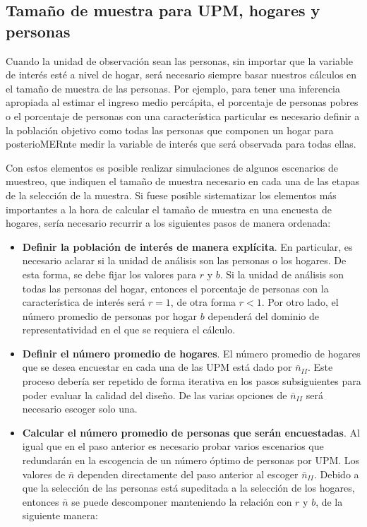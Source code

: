 \documentclass[
  12pt,
  spanish,
]{book}
\begin{document}
\hypertarget{tamauxf1o-de-muestra-para-upm-hogares-y-personas}{%
\subsection{Tamaño de muestra para UPM, hogares y personas}\label{tamauxf1o-de-muestra-para-upm-hogares-y-personas}}

Cuando la unidad de observación sean las personas, sin importar que la variable de interés esté a nivel de hogar, será necesario siempre basar nuestros cálculos en el tamaño de muestra de las personas. Por ejemplo, para tener una inferencia apropiada al estimar el ingreso medio percápita, el porcentaje de personas pobres o el porcentaje de personas con una característica particular es necesario definir a la población objetivo como todas las personas que componen un hogar para posterioMERnte medir la variable de interés que será observada para todas ellas.

Con estos elementos es posible realizar simulaciones de algunos escenarios de muestreo, que indiquen el tamaño de muestra necesario en cada una de las etapas de la selección de la muestra. Si fuese posible sistematizar los elementos más importantes a la hora de calcular el tamaño de muestra en una encuesta de hogares, sería necesario recurrir a los siguientes pasos de manera ordenada:

\begin{itemize}
\item
  \textbf{Definir la población de interés de manera explícita}. En particular, es necesario aclarar si la unidad de análisis son las personas o los hogares. De esta forma, se debe fijar los valores para \(r\) y \(b\). Si la unidad de análisis son todas las personas del hogar, entonces el porcentaje de personas con la característica de interés será \(r = 1\), de otra forma \(r<1\). Por otro lado, el número promedio de personas por hogar \(b\) dependerá del dominio de representatividad en el que se requiera el cálculo.
\item
  \textbf{Definir el número promedio de hogares}. El número promedio de hogares que se desea encuestar en cada una de las UPM está dado por \(\bar{n}_{II}\). Este proceso debería ser repetido de forma iterativa en los pasos subsiguientes para poder evaluar la calidad del diseño. De las varias opciones de \(\bar{n}_{II}\) será necesario escoger solo una.
\item
  \textbf{Calcular el número promedio de personas que serán encuestadas}. Al igual que en el paso anterior es necesario probar varios escenarios que redundarán en la escogencia de un número óptimo de personas por UPM. Los valores de \(\bar{n}\) dependen directamente del paso anterior al escoger \(\bar{n}_{II}\). Debido a que la selección de las personas está supeditada a la selección de los hogares, entonces \(\bar{n}\) se puede descomponer manteniendo la relación con \(r\) y \(b\), de la siguiente manera:
\end{itemize}
\end{document}
